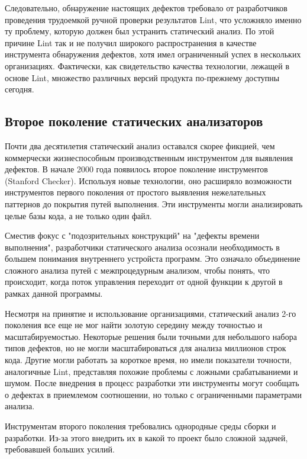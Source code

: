 Следовательно, обнаружение настоящих дефектов требовало от разработчиков проведения трудоемкой 
ручной проверки результатов Lint, что усложняло именно ту проблему, которую должен был 
устранить статический анализ. По этой причине Lint так и не получил широкого распространения в 
качестве инструмента обнаружения дефектов, хотя имел ограниченный успех в нескольких 
организациях. Фактически, как свидетельство качества технологии, лежащей в основе Lint, 
множество различных версий продукта по-прежнему доступны сегодня. %

\subsection{Второе поколение статических анализаторов}

Почти два десятилетия статический анализ оставался скорее фикцией, чем коммерчески 
жизнеспособным производственным инструментом для выявления дефектов. В начале 2000 года
появилось второе поколение инструментов (Stanford Checker). Используя новые 
технологии, оно расширяло возможности инструментов первого поколения от простого выявления 
нежелательных паттернов до покрытия путей выполнения. Эти инструменты могли анализировать 
целые базы кода, а не только один файл. 

Сместив фокус с "подозрительных конструкций" на "дефекты времени выполнения", разработчики 
статического анализа осознали необходимость в большем понимания внутреннего 
устройста программ. Это означало объединение сложного анализа путей с межпроцедурным анализом, 
чтобы понять, что происходит, когда поток управления переходит от одной функции к другой в 
рамках данной программы.

Несмотря на принятие и использование организациями, статический анализ 2-го поколения все еще 
не мог найти золотую середину между точностью и масштабируемостью. Некоторые решения были 
точными для небольшого набора типов дефектов, но не могли масштабироваться для анализа 
миллионов строк кода. Другие могли работать за короткое время, но имели показатели точности, 
аналогичные Lint, представляя похожие проблемы с ложными срабатываниеми и шумом. После 
внедрения в процесс разработки эти инструменты могут сообщать о дефектах в приемлемом 
соотношении, но только с ограниченными параметрами анализа. 

Инструментам второго поколения требовались однородные среды сборки и разработки. 
Из-за этого внедрить их в какой то проект было сложной задачей, требовавшей больших усилий.

